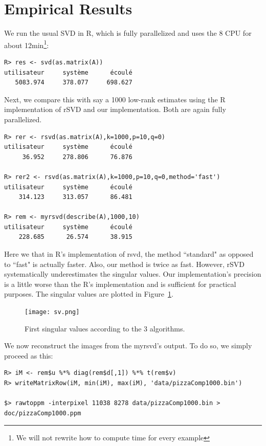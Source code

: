 \documentclass[a4paper,11pt]{amsart}
\begin{document}
\section{Empirical Results}

We run the usual SVD in R, which is fully parallelized and uses the 8 CPU for about 12min\footnote{We will not rewrite how to compute time for every example}:
\begin{verbatim}
R> res <- svd(as.matrix(A))
utilisateur     système      écoulé
   5083.974     378.077     698.627
\end{verbatim}

Next, we compare this with say a 1000 low-rank estimates using the R implementation of rSVD and our implementation. Both are again fully parallelized.
\begin{verbatim}
R> rer <- rsvd(as.matrix(A),k=1000,p=10,q=0)
utilisateur     système      écoulé
     36.952     278.806      76.876

R> rer2 <- rsvd(as.matrix(A),k=1000,p=10,q=0,method='fast')
utilisateur     système      écoulé
    314.123     313.057      86.481

R> rem <- myrsvd(describe(A),1000,10)
utilisateur     système      écoulé
    228.685      26.574      38.915
\end{verbatim}
Here we that in R's implementation of rsvd, the method ``standard" as opposed to ``fast" is actually faster. Also, our method is twice as fast. However, rSVD systematically underestimates the singular values. Our implementation's precision is a little worse than the R's implementation and is sufficient for practical purposes. The singular values are plotted in Figure~\ref{sv}.
\begin{figure}[ht]
  \centering
  \texttt{[image: sv.png]}
  \caption{First singular values according to the 3 algorithms.}
  \label{sv}
\end{figure}

We now reconstruct the images from the myrsvd's output. To do so, we simply proceed as this:
\begin{verbatim}
R> iM <- rem$u %*% diag(rem$d[,1]) %*% t(rem$v)
R> writeMatrixRow(iM, min(iM), max(iM), 'data/pizzaComp1000.bin')

$> rawtoppm -interpixel 11038 8278 data/pizzaComp1000.bin > doc/pizzaComp1000.ppm 
\end{verbatim}
\end{document}

